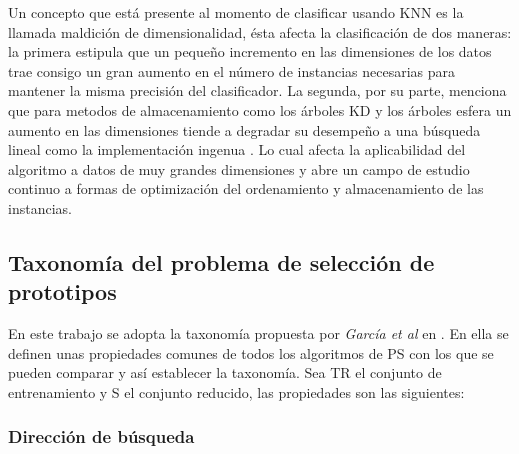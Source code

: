 Un concepto que está presente al momento de clasificar usando KNN es la llamada maldición de dimensionalidad, ésta afecta la clasificación de dos maneras: la primera estipula que un pequeño incremento en las dimensiones de los datos trae consigo un gran aumento en el número de instancias necesarias para mantener la misma precisión del clasificador. La segunda, por su parte, menciona que para metodos de almacenamiento como los árboles KD y los árboles esfera un aumento en las dimensiones tiende a degradar su desempeño a una búsqueda lineal como la implementación ingenua \cite{keogh2017curse}. Lo cual afecta la aplicabilidad del algoritmo a datos de muy grandes dimensiones y abre un campo de estudio continuo a formas de optimización del ordenamiento y almacenamiento de las instancias.

\subsection{Taxonomía del problema de selección de prototipos}

En este trabajo se adopta la taxonomía propuesta por \emph{García et al} en \cite{garcia2012prototype}. En ella se definen unas propiedades comunes de todos los algoritmos de PS con los que se pueden comparar y así establecer la taxonomía. Sea TR el conjunto de entrenamiento y S el conjunto reducido, las propiedades son las siguientes:

\subsubsection{Dirección de búsqueda}

